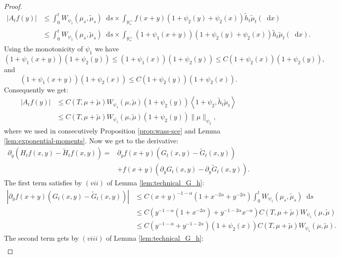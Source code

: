 \documentclass[11pt,a4paper]{article}
\newcommand{\RRP}{\mathbb{R}^+_*}
\newcommand{\brac}[1]{\left\langle#1\right\rangle}
\newcommand{\dd}{\mathop{}\!\mathrm{d}}
\begin{document}
\begin{proof}
    \begin{align*}
        \left|A_tf(y)\right| 
        &\leq \int_0^t W_{\psi_1}(\mu_s,\tilde{\mu}_s) \dd s \times \int_{\RRP} f(x+y)\left(1 + \psi_2(y) + \psi_2(x) \right) \tilde{h}_t\tilde{\mu}_t(\dd x) \\
        &\leq \int_0^t W_{\psi_1}(\mu_s,\tilde{\mu}_s) \dd s \times \int_{\RRP} (1 + \psi_1(x+y))\left(1 + \psi_2(y) + \psi_2(x) \right) \tilde{h}_t\tilde{\mu}_t(\dd x).
    \end{align*}
    Using the monotonicity of $\psi_1$ we have 
    \[(1 + \psi_1(x+y) )(1 +\psi_2(y)) \leq (1 + \psi_1(x) )(1 + \psi_2(y)) \leq C(1 + \psi_2(x))(1 + \psi_2(y)),
    \]
    and
    \[(1 + \psi_1(x+y) )(1 +\psi_2(x)) \leq C(1 + \psi_2(y))(1 + \psi_2(x)).
    \]
    Consequently we get:
    \begin{align*}
        \left|A_tf(y)\right| 
        &\leq C(T,\mu + \tilde{\mu}) W_{\psi_1}\left(\mu,\tilde{\mu}\right)  \left(1 + \psi_2(y) \right) \brac{1+\psi_2,\tilde{h}_t\tilde{\mu}_t} \\
        &\leq C(T,\mu + \tilde{\mu}) W_{\psi_1}\left(\mu,\tilde{\mu}\right)  \left(1 + \psi_2(y) \right) \|\mu\|_{\psi_2},
    \end{align*}
    where we used in consecutively Proposition \ref{prop:wass-sce} and Lemma \ref{lem:exponential-moments}. Now we get to the derivative:
    \begin{align*}
        \partial_y \left( H_tf(x,y)-\tilde{H}_tf(x,y)\right) =& \partial_y f(x+y) \left(G_t(x,y) - \tilde{G}_t(x,y) \right)\\
         &+ f(x+y)\left( \partial_y G_t(x,y) - \partial_y \tilde{G}_t(x,y) \right).
    \end{align*}
    The first term satisfies by $(vii)$ of Lemma \ref{lem:technical_G_h}:
    \begin{align*}
        \left| \partial_y f(x+y) \left(G_t(x,y) - \tilde{G}_t(x,y) \right) \right| 
        &\leq C(x+y)^{-1-\alpha} (1 + x^{-2\alpha} + y^{-2\alpha}) \int_0^t W_{\psi_1}(\mu_s,\tilde{\mu}_s) \dd s \\
        &\leq C( y^{-1-\alpha}( 1 + x^{-2\alpha}) + y^{-1 - 2\alpha}x^{-\alpha} ) C(T,\mu + \tilde{\mu}) W_{\psi_1}(\mu,\tilde{\mu}) \\
        &\leq C(y^{-1-\alpha} + y^{-1 - 2\alpha})(1 + \psi_2(x)) C(T,\mu + \tilde{\mu}) W_{\psi_1}(\mu,\tilde{\mu}) .
    \end{align*}
    The second term gets by $(viii)$ of Lemma \ref{lem:technical_G_h}:
    \begin{multline*}

\end{multline*}
\end{proof}
\end{document}
